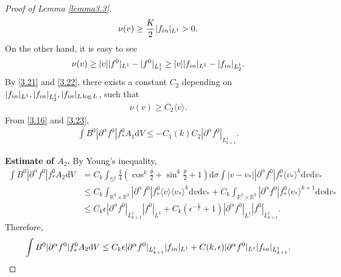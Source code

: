 \documentclass[10pt,a4paper]{amsart}
\def\pa{\partial}
\def\th{\theta}
\let\al=\alpha
\newcommand{\ben}{\begin{eqnarray}}
\newcommand{\beq}{\begin{equation}}
\newcommand{\een}{\end{eqnarray}}
\newcommand{\eeq}{\end{equation}}
\begin{document}
\begin{proof}[Proof of Lemma \ref{lemma3.3}]
\ben\label{3.21}
\nu(v)\ge \frac{K}{2}|f_{\textup{in}}|_{L^1}>0.
\een
On the other hand, it is easy to see
\beq\label{3.22}
\nu(v)\ge |v||f^0|_{L^1}-|f^0|_{L^1_1}\ge |v||f_{\textup{in}}|_{L^1}-|f_{\textup{in}}|_{L^1_2}.
\eeq
    By \eqref{3.21} and \eqref{3.22}, there exists a constant $C_2$ depending on $|f_{\textup{in}}|_{L^1},|f_{\textup{in}}|_{L^1_2},|f_{\textup{in}}|_{L\log L}$, such that 
    \ben\label{3.23}
\nu(v)\ge C_2\langle v \rangle .
    \een
    From \eqref{3.16} and \eqref{3.23},
\ben\label{3.24}
    \int B^0|\pa^{\al}f^0|f^0_*A_1\mathrm{d}V\le -C_1(k)C_2|\pa^{\al}f^0|_{L^1_{k+1}}.
\een

 \textbf{Estimate of $A_2$.} By Young's inequality,
$$
\begin{aligned}
\int B^0|\pa^{\al}f^0|f^0_* A_2\mathrm{d}V&= C_k\int_{\mathbb{S}^2}\frac{1}{4}(\cos^{k}\frac{\th}{2}+\sin^{k}\frac{\th}{2}+1)\mathrm{d}\sigma\int |v-v_*||\pa^{\al}f^0|f^0_*\langle v_*\rangle^{k}\mathrm{d}v\mathrm{d}v_*\\
&\le C_k\int_{\mathbb{R}^3\times\mathbb{R}^3}|\pa^{\al}f^0|f^0_*\langle v\rangle\langle v_*\rangle^{k}\mathrm{d}v\mathrm{d}v_*+
C_k\int_{\mathbb{R}^3\times\mathbb{R}^3}|\pa^{\al}f^0|f^0_*\langle v_*\rangle^{k+1}\mathrm{d}v\mathrm{d}v_*\\
&\le C_k\epsilon |\pa^{\al}f^0|_{L^1_{k+1}}|f^0|_{L^1}+C_k(\epsilon^{-\frac{1}{k}}+1)|\pa^{\al}f^0|_{L^1}|f^0|_{L^1_{k+1}}.
\end{aligned}
$$
Therefore,
\ben\label{3.25}
\int B^0|\pa^{\al}f^0|f^0_* A_2\mathrm{d}V\le C_k\epsilon |\pa^{\al}f^0|_{L^1_{k+1}}|f_{\textup{in}}|_{L^1}+C(k,\epsilon)|\pa^{\al}f^0|_{L^1}|f_{\textup{in}}|_{L^1_{k+1}}.
\een


\end{proof}
\end{document}
